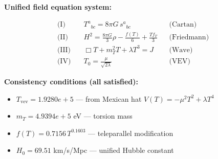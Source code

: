 
\textbf{Unified field equation system:}

\begin{align}
  \text{(I)} \quad & T^a{}_{bc} = 8\pi G \, s^a{}_{bc} && \text{(Cartan)} \\
  \text{(II)} \quad & H^2 = \frac{8\pi G}{3}\rho - \frac{f(T)}{6} + \frac{Tf_T}{3} && \text{(Friedmann)} \\
  \text{(III)} \quad & \Box T + m_T^2 T + \lambda T^3 = J && \text{(Wave)} \\
  \text{(IV)} \quad & T_0 = \frac{\mu}{\sqrt{2\lambda}} && \text{(VEV)}
\end{align}

\textbf{Consistency conditions (all satisfied):}
\begin{itemize}
  \item $T_{\text{vev}} = 1.9280e+5$ — from Mexican hat $V(T) = -\mu^2 T^2 + \lambda T^4$
  \item $m_T = 4.9394e+5$ eV — torsion mass
  \item $f(T) = 0.7156 \, T^{0.1603}$ — teleparallel modification
  \item $H_0 = 69.51$ km/s/Mpc — unified Hubble constant
\end{itemize}